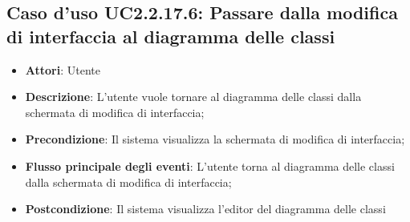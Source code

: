 \documentclass[../AnalisiDeiRequisiti.tex]{subfiles}
\begin{document}
				\subsection{Caso d'uso UC2.2.17.6: Passare dalla modifica di interfaccia al diagramma delle classi}
				\begin{itemize}
					\item \textbf{Attori}: Utente
					\item \textbf{Descrizione}: L'utente vuole tornare al diagramma delle classi dalla schermata di modifica di interfaccia;
					\item \textbf{Precondizione}: Il sistema visualizza la schermata di modifica di interfaccia;
					\item \textbf{Flusso principale degli eventi}: L'utente torna al diagramma delle classi dalla schermata di modifica di interfaccia;
					\item \textbf{Postcondizione}: Il sistema visualizza l'editor del diagramma delle classi
				\end{itemize}
\end{document}
